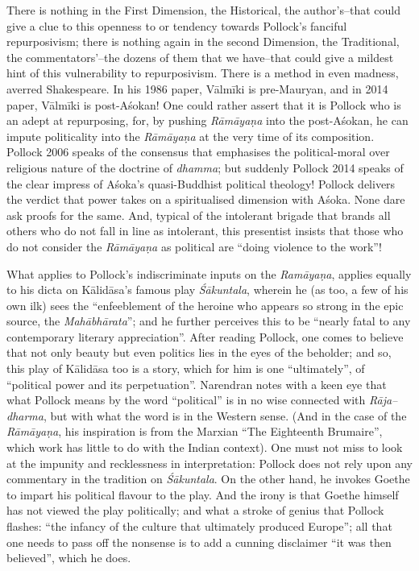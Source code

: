 There is nothing in the First Dimension, the Historical, the author’s–that could give a clue to this openness to or tendency towards Pollock’s fanciful repurposivism; there is nothing again in the second Dimension, the Traditional, the commentators’–the dozens of them that we have–that could give a mildest hint of this vulnerability to repurposivism. There is a method in even madness, averred Shakespeare. In his 1986 paper, Vālmīki is pre-Mauryan, and in 2014 paper, Vālmīki is post-Aśokan! One could rather assert that it is Pollock who is an adept at repurposing, for, by pushing \textit{Rāmāyaṇa} into the post-Aśokan, he can impute politicality into the \textit{Rāmāyaṇa} at the very time of its composition. Pollock 2006 speaks of the consensus that emphasises the political-moral over religious nature of the doctrine of \textit{dhamma}; but suddenly Pollock 2014 speaks of the clear impress of Aśoka’s quasi-Buddhist political theology! Pollock delivers the verdict that power takes on a spiritualised dimension with Aśoka. None dare ask proofs for the same. And, typical of the intolerant brigade that brands all others who do not fall in line as intolerant, this presentist insists that those who do not consider the \textit{Rāmāyaṇa} as political are “doing violence to the work”!

What applies to Pollock’s indiscriminate inputs on the \textit{Ramāyaṇa}, applies equally to his dicta on Kālidāsa’s famous play \textit{Śākuntala}, wherein he (as too, a few of his own ilk) sees the “enfeeblement of the heroine who appears so strong in the epic source, the \textit{Mahābhārata}”; and he further perceives this to be “nearly fatal to any contemporary literary appreciation”. After reading Pollock, one comes to believe that not only beauty but even politics lies in the eyes of the beholder; and so, this play of Kālidāsa too is a story, which for him is one “ultimately”, of “political power and its perpetuation”. Narendran notes with a keen eye that what Pollock means by the word “political” is in no wise connected with \textit{Rāja–dharma}, but with what the word is in the Western sense. (And in the case of the \textit{Rāmāyaṇa}, his inspiration is from the Marxian “The Eighteenth Brumaire”, which work has little to do with the Indian context). One must not miss to look at the impunity and recklessness in interpretation: Pollock does not rely upon any commentary in the tradition on \textit{Śākuntala}. On the other hand, he invokes Goethe to impart his political flavour to the play. And the irony is that Goethe himself has not viewed the play politically; and what a stroke of genius that Pollock flashes: “the infancy of the culture that ultimately produced Europe”; all that one needs to pass off the nonsense is to add a cunning disclaimer “it was then believed”, which he does.

